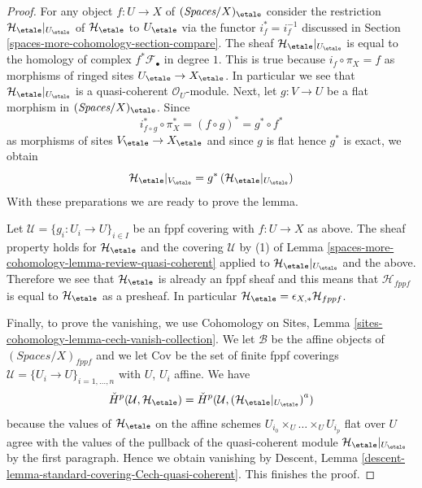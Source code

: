 \begin{proof}
For any object $f : U \to X$ of $(\textit{Spaces}/X)_\etale$
consider the restriction
$\mathcal{H}_\etale|_{U_\etale}$ of $\mathcal{H}_\etale$ to $U_\etale$ via
the functor $i_f^* = i_f^{-1}$ discussed in Section \ref{spaces-more-cohomology-section-compare}.
The sheaf $\mathcal{H}_\etale|_{U_\etale}$
is equal to the homology of complex $f^*\mathcal{F}_\bullet$ in degree $1$.
This is true because $i_f \circ \pi_X = f$ as morphisms of ringed sites
$U_\etale \to X_\etale$. In particular we see that
$\mathcal{H}_\etale|_{U_\etale}$ is a quasi-coherent $\mathcal{O}_U$-module.
Next, let $g : V \to U$ be a flat
morphism in $(\textit{Spaces}/X)_\etale$. Since
$$
i_{f \circ g}^* \circ \pi_X^* = (f \circ g)^* = g^* \circ f^*
$$
as morphisms of sites $V_\etale \to X_\etale$ and since $g$ is flat
hence $g^*$ is exact, we obtain
$$
\mathcal{H}_\etale|_{V_\etale} =
g^*\left(\mathcal{H}_\etale|_{U_\etale}\right)
$$
With these preparations we are ready to prove the lemma.

\medskip\noindent
Let $\mathcal{U} = \{g_i : U_i \to U\}_{i \in I}$ be an fppf covering
with $f : U \to X$ as above. The sheaf property holds for
$\mathcal{H}_\etale$ and the covering $\mathcal{U}$
by (1) of Lemma \ref{spaces-more-cohomology-lemma-review-quasi-coherent}
applied to $\mathcal{H}_\etale|_{U_\etale}$ and the above.
Therefore we see that $\mathcal{H}_\etale$ is already an fppf
sheaf and this means that $\mathcal{H}_{fppf}$ is
equal to $\mathcal{H}_\etale$
as a presheaf. In particular
$\mathcal{H}_\etale = \epsilon_{X, *}\mathcal{H}_{fppf}$.

\medskip\noindent
Finally, to prove the vanishing, we use
Cohomology on Sites, Lemma \ref{sites-cohomology-lemma-cech-vanish-collection}.
We let $\mathcal{B}$ be the affine objects of
$(\textit{Spaces}/X)_{fppf}$ and we let
$\text{Cov}$ be the set of finite fppf coverings
$\mathcal{U} = \{U_i \to U\}_{i = 1, \ldots, n}$ with $U$, $U_i$ affine.
We have
$$
{\check H}^p(\mathcal{U}, \mathcal{H}_\etale) =
{\check H}^p(\mathcal{U}, \left(\mathcal{H}_\etale|_{U_\etale}\right)^a)
$$
because the values of $\mathcal{H}_\etale$ on the
affine schemes $U_{i_0} \times_U \ldots \times_U U_{i_p}$
flat over $U$ agree with the values of the pullback
of the quasi-coherent module $\mathcal{H}_\etale|_{U_\etale}$ by
the first paragraph. Hence we obtain vanishing by
Descent, Lemma \ref{descent-lemma-standard-covering-Cech-quasi-coherent}.
This finishes the proof.
\end{proof}

